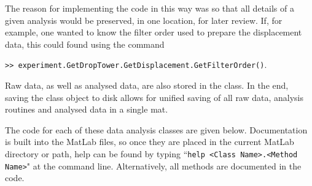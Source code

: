 The reason for implementing the code in this way was so that all details of a given analysis would be preserved, in one location, for later review.
If, for example, one wanted to know the filter order used to prepare the displacement data, this could found using the command 

\texttt{>> experiment.GetDropTower.GetDisplacement.GetFilterOrder()}.

Raw data, as well as analysed data, are also stored in the class.
In the end, saving the class object to disk allows for unified saving of all raw data, analysis routines and analysed data in a single \ac{mat}.
 
The code for each of these data analysis classes are given below.
Documentation is built into the MatLab files, so once they are placed in the current MatLab directory or path, help can be found by typing ``\texttt{help <Class Name>.<Method Name>}" at the command line.
Alternatively, all methods are documented in the code.

